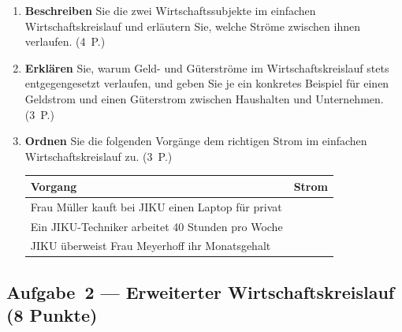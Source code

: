 \documentclass[11pt, a4paper]{article}
\begin{document}
\begin{enumerate}[label=(\alph*)]
  \item \textbf{Beschreiben} Sie die zwei Wirtschaftssubjekte im einfachen Wirtschaftskreislauf
  und erläutern Sie, welche Ströme zwischen ihnen verlaufen. \hfill (4~P.)

  \vspace{6cm}

  \item \textbf{Erklären} Sie, warum Geld- und Güterströme im Wirtschaftskreislauf stets
  entgegengesetzt verlaufen, und geben Sie je ein konkretes Beispiel für einen Geldstrom
  und einen Güterstrom zwischen Haushalten und Unternehmen. \hfill (3~P.)

  \vspace{5cm}

  \item \textbf{Ordnen} Sie die folgenden Vorgänge dem richtigen Strom im einfachen
  Wirtschaftskreislauf zu. \hfill (3~P.)

  \bigskip

  \noindent
  \begin{tabular}{|p{6cm}|p{7cm}|}
  \hline
  \textbf{Vorgang} & \textbf{Strom}\\
  \hline
  Frau Müller kauft bei JIKU einen Laptop für privat & \\[0.8cm]
  \hline
  Ein JIKU-Techniker arbeitet 40 Stunden pro Woche & \\[0.8cm]
  \hline
  JIKU überweist Frau Meyerhoff ihr Monatsgehalt & \\[0.8cm]
  \hline
  \end{tabular}
\end{enumerate}

\subsection*{Aufgabe~2 --- Erweiterter Wirtschaftskreislauf (8 Punkte)}
\end{document}
